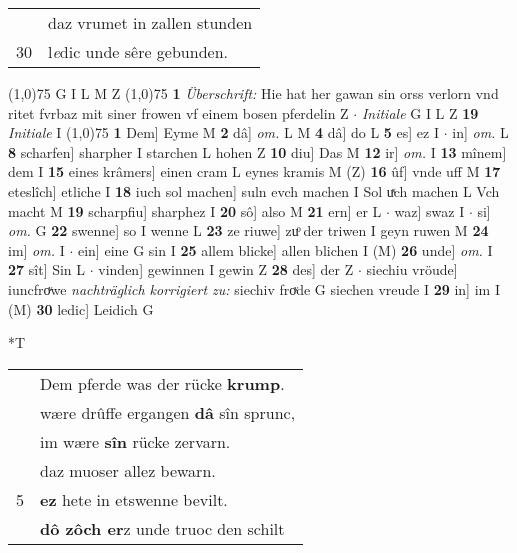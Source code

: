 \documentclass[8pt,a4paper,notitlepage]{article}
\begin{document}
\begin{table}[ht]
\begin{minipage}[t]{0.5\linewidth}
\begin{tabular}{rl}
 & daz vrumet in zallen stunden\\ 
30 & l\textit{e}dic unde sêre gebunden.\\ 
\end{tabular}
\scriptsize
\line(1,0){75} \newline
G I L M Z \newline
\line(1,0){75} \newline
\textbf{1} \textit{Überschrift:} Hie hat her gawan sin orss verlorn vnd ritet fvrbaz mit siner frowen vf einem bosen pferdelin Z   $\cdot$ \textit{Initiale} G I L Z  \textbf{19} \textit{Initiale} I  \newline
\line(1,0){75} \newline
\textbf{1} Dem] Eyme M \textbf{2} dâ] \textit{om.} L M \textbf{4} dâ] do L \textbf{5} es] ez I  $\cdot$ in] \textit{om.} L \textbf{8} scharfen] sharpher I starchen L hohen Z \textbf{10} diu] Das M \textbf{12} ir] \textit{om.} I \textbf{13} mînem] dem I \textbf{15} eines krâmers] einen cram L eynes kramis M (Z) \textbf{16} ûf] vnde uff M \textbf{17} eteslîch] etliche I \textbf{18} iuch sol machen] suln evch machen I Sol uͯch machen L Vch macht M \textbf{19} scharpfiu] sharphez I \textbf{20} sô] also M \textbf{21} ern] er L  $\cdot$ waz] swaz I  $\cdot$ si] \textit{om.} G \textbf{22} swenne] so I wenne L \textbf{23} ze riuwe] zuͦ der triwen I geyn ruwen M \textbf{24} im] \textit{om.} I  $\cdot$ ein] eine G sin I \textbf{25} allem blicke] allen blichen I (M) \textbf{26} unde] \textit{om.} I \textbf{27} sît] Sin L  $\cdot$ vinden] gewinnen I gewin Z \textbf{28} des] der Z  $\cdot$ siechiu vröude] iuncfroͮwe \textit{nachträglich korrigiert zu:} siechiv froͮde G siechen vreude I \textbf{29} in] im I (M) \textbf{30} ledic] Leidich G \newline
\end{minipage}
\hspace{0.5cm}
\begin{minipage}[t]{0.5\linewidth}
\small
\begin{center}*T
\end{center}
\begin{tabular}{rl}
 & Dem pferde was der rücke \textbf{krump}.\\ 
 & wære drûffe ergangen \textbf{dâ} sîn sprunc,\\ 
 & im wære \textbf{sîn} rücke zervarn.\\ 
 & daz muoser allez bewarn.\\ 
5 & \textbf{ez} hete in etswenne bevilt.\\ 
 & \textbf{dô zôch er}z unde truoc den schilt\\ 

\end{tabular}
\end{minipage}
\end{table}
\end{document}
